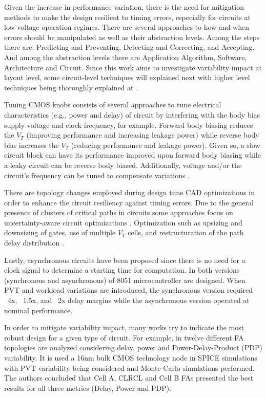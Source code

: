 \documentclass[pgmicro,mestrado,english]{iiufrgs}
\begin{document}
Given the increase in performance variation, there is the need for mitigation methods to make the design resilient to timing errors, especially for circuits at low voltage operation regimes. There are several approaches to how and when errors should be manipulated as well as their abstraction levels. Among the steps there are: Predicting and Preventing, Detecting and Correcting, and Accepting. And among the abstraction levels there are Application Algorithm, Software, Architecture and Circuit. Since this work aims to investigate variability impact at layout level, some circuit-level techniques will explained next with higher level techniques being thoroughly explained at \cite{rahimi2016variability}.

Tuning CMOS knobs consists of several approaches to tune electrical characteristics (e.g., power and delay) of circuit by interfering with the body bias supply voltage and clock frequency, for example. Forward body biasing reduces the $V_T$ (improving performance and increasing leakage power) while reverse body bias increases the $V_T$ (reducing performance and leakage power). Given so, a slow circuit block can have its performance improved upon forward body biasing while a leaky circuit can be reverse body biased. Additionally, voltage and/or the circuit's frequency can be tuned to compensate variations \cite{dighe2011within, tschanz2002adaptive, borkar2004design}.

There are topology changes employed during design time CAD optimizations in order to enhance the circuit resiliency against timing errors. Due to the general presence of clusters of critical paths in circuits some approaches focus on uncertainty-aware circuit optimizations \cite{bai2002uncertainty}. Optimization such as upsizing and downsizing of gates, use of multiple $V_T$ cells, and restructuration of the path delay distribution \cite{kahng2010slack}.

Lastly, asynchronous circuits have been proposed since there is no need for a clock signal to determine a starting time for computation. In \cite{chang2013synchronous} both versions (synchronous and  asynchronous) of 8051 microcontroller are designed. When PVT and workload variations are introduced, the synchronous version required ~4x, ~1.5x, and ~2x delay margins while the asynchronous version operated at nominal performance.

In order to mitigate variability impact, many works try to indicate the most robust design for a given type of circuit. For example, in \cite{dokania2013investigation} twelve different FA topologies are analyzed considering delay, power and Power-Delay-Product (PDP) variability. It is used a 16nm bulk CMOS technology node in SPICE simulations with PVT variability being considered and Monte Carlo simulations performed. The authors concluded that Cell A, CLRCL and Cell B FAs presented the best results for all three metrics (Delay, Power and PDP).
\end{document}
